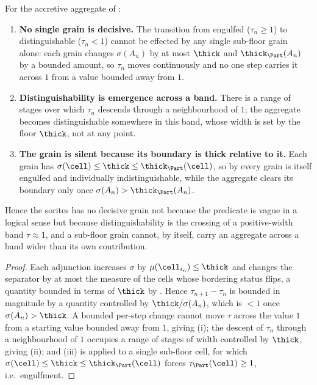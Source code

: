 \begin{corollary}
\label{cor:sorites}
For the accretive aggregate of :
\begin{enumerate}[label=\textup{(\roman*)},leftmargin=2.2em]
\item \textbf{No single grain is decisive.} The transition from engulfed
\textup{(}$\tau_n\ge1$\textup{)} to distinguishable \textup{(}$\tau_n<1$\textup{)}
cannot be effected by any single sub-floor grain alone: each grain changes
$\sigma(A_n)$ by at most $\thick$ and $\thick_\Part(A_n)$ by a bounded amount, so
$\tau_n$ moves continuously and no one step carries it across $1$ from a value
bounded away from $1$.
\item \textbf{Distinguishability is emergence across a band.} There is a range of
stages over which $\tau_n$ descends through a neighbourhood of $1$; the aggregate
becomes distinguishable somewhere in this band, whose width is set by the floor
$\thick$, not at any point.
\item \textbf{The grain is silent because its boundary is thick relative to it.}
Each grain has $\sigma(\cell)\le\thick\le\thick_\Part(\cell)$, so by
 every grain is itself engulfed and individually
indistinguishable, while the aggregate clears its boundary only once
$\sigma(A_n)>\thick_\Part(A_n)$.
\end{enumerate}
Hence the sorites has no decisive grain not because the predicate is vague in a
logical sense but because distinguishability is the crossing of a positive-width
band $\tau\approx1$, and a sub-floor grain cannot, by itself, carry an aggregate
across a band wider than its own contribution.
\end{corollary}

\begin{proof}
Each adjunction increases $\sigma$ by $\mu(\cell_{i_n})\le\thick$ and changes the
separator by at most the measure of the cells whose bordering status flips, a
quantity bounded in terms of $\thick$ by . Hence
$\tau_{n+1}-\tau_n$ is bounded in magnitude by a quantity controlled by
$\thick/\sigma(A_n)$, which is $<1$ once $\sigma(A_n)>\thick$. A bounded
per-step change cannot move $\tau$ across the value $1$ from a starting value
bounded away from $1$, giving (i); the descent of $\tau_n$ through a
neighbourhood of $1$ occupies a range of stages of width controlled by $\thick$,
giving (ii); and (iii) is  applied to a single
sub-floor cell, for which $\sigma(\cell)\le\thick\le\thick_\Part(\cell)$ forces
$\tau_\Part(\cell)\ge1$, i.e.\ engulfment.
\end{proof}

